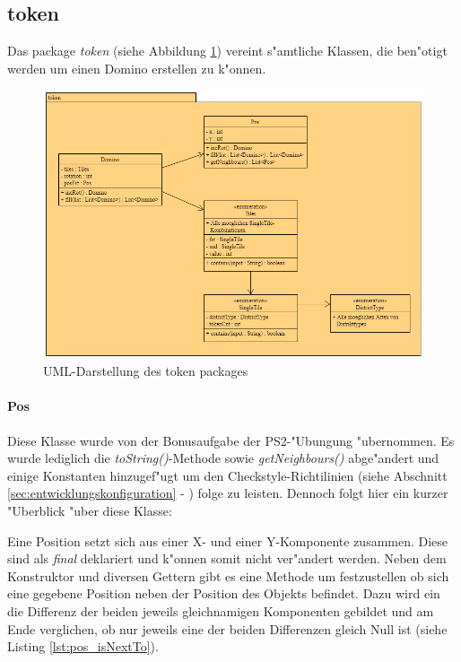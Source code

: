 \newpage
\subsection{token}
\label{ss:token}
Das package \emph{token} (siehe Abbildung \ref{fig:tokenPackage}) vereint s"amtliche Klassen, die ben"otigt werden um einen Domino erstellen zu k"onnen. 

\begin{figure}
	\centering
	\includegraphics{pics/tokenPackage}
	\caption{UML-Darstellung des token packages}
	\label{fig:tokenPackage}
\end{figure}

\paragraph{Pos}
\label{par:pos}
Diese Klasse wurde von der Bonusaufgabe der PS2-"Ubungung "ubernommen. Es wurde lediglich die \emph{toString()}-Methode sowie \emph{getNeighbours()} abge"andert und einige Konstanten hinzugef"ugt um den Checkstyle-Richtilinien 
(siehe Abschnitt \ref{sec:entwicklungskonfiguration} - ) 
folge zu leisten. Dennoch folgt hier ein kurzer "Uberblick "uber diese Klasse: 

Eine Position setzt sich aus einer X- und einer Y-Komponente zusammen. Diese sind als \emph{final} deklariert und k"onnen somit nicht ver"andert werden. Neben dem Konstruktor und diversen Gettern gibt es eine Methode um festzustellen ob sich eine gegebene Position neben der Position des Objekts befindet. Dazu wird ein die Differenz der beiden jeweils gleichnamigen Komponenten gebildet und am Ende verglichen, ob nur jeweils eine der beiden Differenzen gleich Null ist (siehe Listing \ref{lst:pos_isNextTo}). 

